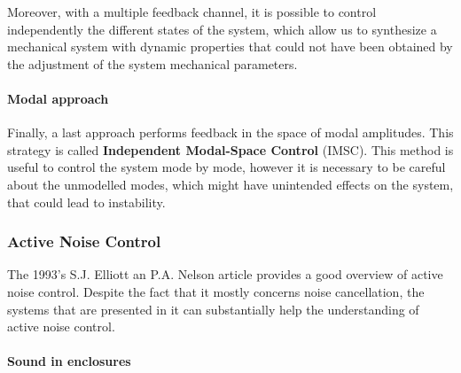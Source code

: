 \documentclass[11pt, twocolumn]{article}
\begin{document}
Moreover, with a multiple feedback channel, it is possible to control independently the different states of the system, which allow us to synthesize a mechanical system with dynamic properties that could not have been obtained by the adjustment of the system mechanical parameters.\\

\vspace{-10 pt}
\paragraph{Modal approach}
Finally, a last approach performs feedback in the space of modal amplitudes. This strategy is called \textbf{Independent Modal-Space Control} (IMSC). This method is useful to control the system mode by mode, however it is necessary to be careful about the unmodelled modes, which might have unintended effects on the system, that could lead to instability. 

\subsubsection{Active Noise Control}

 The 1993's S.J. Elliott an P.A. Nelson article \cite{248551} provides a good overview of active noise control. Despite the fact that it mostly concerns noise cancellation, the systems that are presented in it can substantially help the understanding of active noise control. 
 
 \paragraph{Sound in enclosures}
 
\end{document}
